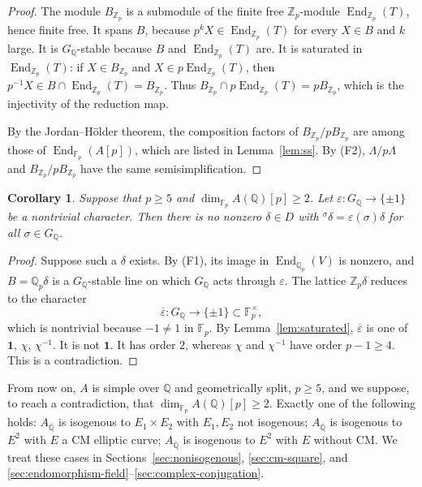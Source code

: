 \documentclass[11pt]{article}
\newtheorem{corollary}[lemma]{Corollary}
\newcommand{\Q}{\mathbb Q}
\newcommand{\Z}{\mathbb Z}
\newcommand{\F}{\mathbb F}
\DeclareMathOperator{\End}{End}
\begin{document}
\begin{proof}
The module \(B_{\Z_p}\) is a submodule of the finite free
\(\Z_p\)-module \(\End_{\Z_p}(T)\), hence finite free. It spans \(B\),
because \(p^kX\in\End_{\Z_p}(T)\) for every \(X\in B\) and \(k\) large.
It is \(G_{\Q}\)-stable because \(B\) and \(\End_{\Z_p}(T)\) are. It is
saturated in \(\End_{\Z_p}(T)\): if \(X\in B_{\Z_p}\) and
\(X\in p\End_{\Z_p}(T)\), then
\(p^{-1}X\in B\cap\End_{\Z_p}(T)=B_{\Z_p}\). Thus
\(B_{\Z_p}\cap p\End_{\Z_p}(T)=pB_{\Z_p}\), which is the injectivity
of the reduction map.

By the Jordan--H\"older theorem, the composition factors of
\(B_{\Z_p}/pB_{\Z_p}\) are among those of \(\End_{\F_p}(A[p])\), which
are listed in Lemma~\ref{lem:ss}. By (F2), \(\Lambda/p\Lambda\) and
\(B_{\Z_p}/pB_{\Z_p}\) have the same semisimplification.
\end{proof}

\begin{corollary}\label{cor:quadratic}
Suppose that \(p\geq5\) and \(\dim_{\F_p}A(\Q)[p]\geq2\). Let
\(\varepsilon:G_{\Q}\to\{\pm1\}\) be a nontrivial character. Then there
is no nonzero \(\delta\in D\) with
\({}^\sigma\delta=\varepsilon(\sigma)\delta\) for all
\(\sigma\in G_{\Q}\).
\end{corollary}

\begin{proof}
Suppose such a \(\delta\) exists. By (F1), its image in
\(\End_{\Q_p}(V)\) is nonzero, and \(B=\Q_p\delta\) is a
\(G_{\Q}\)-stable line on which \(G_{\Q}\) acts through
\(\varepsilon\). The lattice \(\Z_p\delta\) reduces to the character
\[
 \overline\varepsilon:G_{\Q}\to\{\pm1\}\subset\F_p^\times,
\]
which is nontrivial because \(-1\neq1\) in \(\F_p\). By
Lemma~\ref{lem:saturated}, \(\overline\varepsilon\) is one of
\(\mathbf 1\), \(\chi\), \(\chi^{-1}\). It is not \(\mathbf 1\). It has
order \(2\), whereas \(\chi\) and \(\chi^{-1}\) have order
\(p-1\geq4\). This is a contradiction.
\end{proof}

From now on, \(A\) is simple over \(\Q\) and geometrically split,
\(p\geq5\), and we suppose, to reach a contradiction, that
\(\dim_{\F_p}A(\Q)[p]\geq2\). Exactly one of the following holds:
\(A_{\overline{\Q}}\) is isogenous to \(E_1\times E_2\) with
\(E_1,E_2\) not isogenous; \(A_{\overline{\Q}}\) is isogenous to
\(E^2\) with \(E\) a CM elliptic curve; \(A_{\overline{\Q}}\) is
isogenous to \(E^2\) with \(E\) without CM. We treat these cases in
Sections~\ref{sec:nonisogenous}, \ref{sec:cm-square}, and
\ref{sec:endomorphism-field}--\ref{sec:complex-conjugation}.
\end{document}
